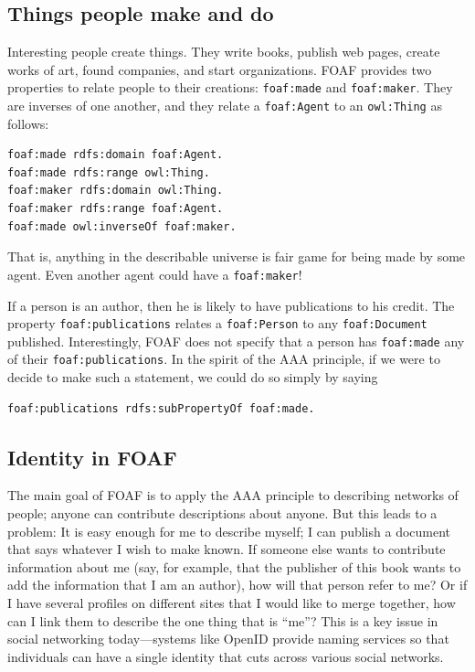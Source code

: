 \subsection{Things people make and do}

Interesting people create things. They write books, publish web pages,
create works of art, found companies, and start organizations. FOAF
provides two properties to relate people to their creations: \texttt{foaf:made}
and \texttt{foaf:maker}. They are inverses of one another, and they relate a
\texttt{foaf:Agent} to an \texttt{owl:Thing} as follows:

\begin{lstlisting}
foaf:made rdfs:domain foaf:Agent.
foaf:made rdfs:range owl:Thing.
foaf:maker rdfs:domain owl:Thing.
foaf:maker rdfs:range foaf:Agent.
foaf:made owl:inverseOf foaf:maker.
\end{lstlisting}

That is, anything in the describable universe is fair game for being
made by some agent. Even another agent could have a \texttt{foaf:maker}!

If a person is an author, then he is likely to have publications to his
credit. The property \texttt{foaf:publications} relates a \texttt{foaf:Person} to any
\texttt{foaf:Document} published. Interestingly, FOAF does not specify that a
person has \texttt{foaf:made} any of their \texttt{foaf:publications}. In the spirit of
the AAA principle, if we were to decide to make such a statement, we
could do so simply by saying

\begin{lstlisting}
foaf:publications rdfs:subPropertyOf foaf:made.
\end{lstlisting}

\subsection{Identity in FOAF}

The main goal of FOAF is to apply the AAA principle to describing
networks of people; anyone can contribute descriptions about anyone. But
this leads to a problem: It is easy enough for me to describe myself; I
can publish a document that says whatever I wish to make known. If
someone else wants to contribute information about me (say, for example,
that the publisher of this book wants to add the information that I am
an author), how will that person refer to me? Or if I have several
profiles on different sites that I would like to merge together, how can
I link them to describe the one thing that is ``me''? This is a key
issue in social networking today---systems like OpenID provide naming
services so that individuals can have a single identity that cuts across
various social networks.

